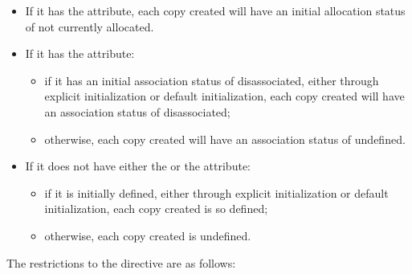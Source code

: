 \begin{itemize} %
\item If it has the  attribute, each copy created will have an initial 
allocation status of not currently allocated.

\item If it has the  attribute:
\begin{itemize} %
\item if it has an initial association status of disassociated, either through explicit 
initialization or default initialization, each copy created will have an association 
status of disassociated;
\item otherwise, each copy created will have an association status of undefined.
\end{itemize} %

\item If it does not have either the  or the  attribute:

\begin{samepage}\begin{itemize} %
\item if it is initially defined, either through explicit initialization or default 
initialization, each copy created is so defined;

\item otherwise, each copy created is undefined.
\end{itemize} %
\end{samepage}

\end{itemize} %
\fortranspecificend

\restrictions
The restrictions to the  directive are as follows:

